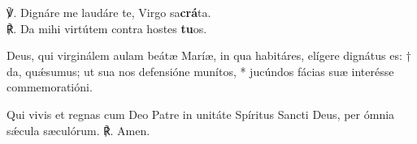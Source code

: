 

\label{prima}

\vspace{1cm}

\deusInAdiutorium

\vfill

\pagebreak




\antiphonaLaudI









\label{primacapitulum}



\noindent ℣. Dignáre me laudáre te, Virgo sa\textbf{crá}ta.\\
℟. Da mihi virtútem contra hostes \textbf{tu}os.

\finisHoraeMinores


Deus, qui virginálem aulam beátæ Maríæ, in qua habitáres,
elígere dignátus es: †
da, quǽsumus; ut sua nos defensióne munítos, *
jucúndos fácias suæ interésse commemoratióni.

Qui vivis et regnas cum Deo Patre in unitáte Spíritus Sancti Deus,
per ómnia sǽcula sæculórum.
℟. Amen.

\vfill
